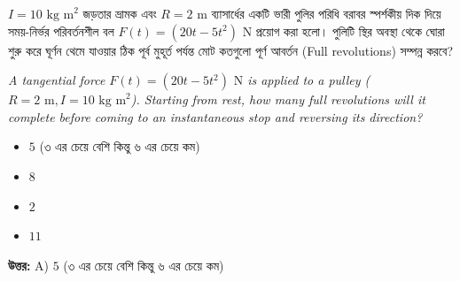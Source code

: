 \documentclass[12pt, a4paper]{article}
\begin{document}
\begin{tcolorbox}[questionbox={প্রশ্ন (Question) 6}]
\noindent
$I = 10\text{ kg m}^2$ জড়তার ভ্রামক এবং $R = 2\text{ m}$ ব্যাসার্ধের একটি ভারী পুলির পরিধি বরাবর স্পর্শকীয় দিক দিয়ে সময়-নির্ভর পরিবর্তনশীল বল $F(t) = (20t - 5t^2)\text{ N}$ প্রয়োগ করা হলো। পুলিটি স্থির অবস্থা থেকে ঘোরা শুরু করে ঘূর্ণন থেমে যাওয়ার ঠিক পূর্ব মুহূর্ত পর্যন্ত মোট কতগুলো পূর্ণ আবর্তন (Full revolutions) সম্পন্ন করবে?
\vspace{0.8em}
\begin{english}
\noindent\textit{\color{darkgray}
A tangential force $F(t) = (20t - 5t^2)\text{ N}$ is applied to a pulley ($R = 2\text{ m}, I = 10\text{ kg m}^2$). Starting from rest, how many full revolutions will it complete before coming to an instantaneous stop and reversing its direction?
}
\end{english}
\end{tcolorbox}

\begin{itemize}[label={}, leftmargin=1cm, itemsep=0.5em]
\item[\textbf{A)}] $5$ (৩ এর চেয়ে বেশি কিন্তু ৬ এর চেয়ে কম)
\item[\textbf{B)}] $8$
\item[\textbf{C)}] $2$
\item[\textbf{D)}] $11$
\end{itemize}
\vspace{0.5em}

\begin{tcolorbox}[answerbox]
\textbf{\color{success} উত্তর:} A) $5$ (৩ এর চেয়ে বেশি কিন্তু ৬ এর চেয়ে কম)
\end{tcolorbox}
\vspace{1em}
\end{document}
